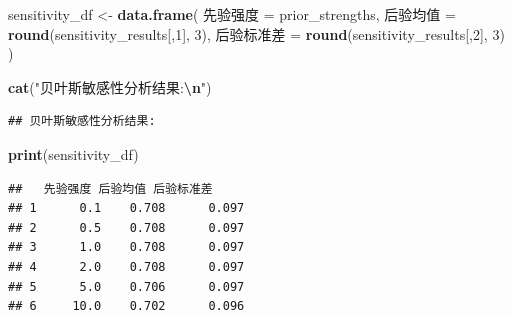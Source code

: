 \documentclass[
]{book}
\newenvironment{Shaded}{\begin{snugshade}}{\end{snugshade}}
\newcommand{\DecValTok}[1]{\textcolor[rgb]{0.00,0.00,0.81}{#1}}
\newcommand{\FunctionTok}[1]{\textcolor[rgb]{0.13,0.29,0.53}{\textbf{#1}}}
\newcommand{\NormalTok}[1]{#1}
\newcommand{\OtherTok}[1]{\textcolor[rgb]{0.56,0.35,0.01}{#1}}
\newcommand{\SpecialCharTok}[1]{\textcolor[rgb]{0.81,0.36,0.00}{\textbf{#1}}}
\newcommand{\StringTok}[1]{\textcolor[rgb]{0.31,0.60,0.02}{#1}}
\begin{document}
\begin{Shaded}
\begin{Highlighting}[]
\NormalTok{sensitivity\_df }\OtherTok{\textless{}{-}} \FunctionTok{data.frame}\NormalTok{(}
\NormalTok{  先验强度 }\OtherTok{=}\NormalTok{ prior\_strengths,}
\NormalTok{  后验均值 }\OtherTok{=} \FunctionTok{round}\NormalTok{(sensitivity\_results[,}\DecValTok{1}\NormalTok{], }\DecValTok{3}\NormalTok{),}
\NormalTok{  后验标准差 }\OtherTok{=} \FunctionTok{round}\NormalTok{(sensitivity\_results[,}\DecValTok{2}\NormalTok{], }\DecValTok{3}\NormalTok{)}
\NormalTok{)}

\FunctionTok{cat}\NormalTok{(}\StringTok{"贝叶斯敏感性分析结果:}\SpecialCharTok{\textbackslash{}n}\StringTok{"}\NormalTok{)}
\end{Highlighting}
\end{Shaded}

\begin{verbatim}
## 贝叶斯敏感性分析结果:
\end{verbatim}

\begin{Shaded}
\begin{Highlighting}[]
\FunctionTok{print}\NormalTok{(sensitivity\_df)}
\end{Highlighting}
\end{Shaded}

\begin{verbatim}
##   先验强度 后验均值 后验标准差
## 1      0.1    0.708      0.097
## 2      0.5    0.708      0.097
## 3      1.0    0.708      0.097
## 4      2.0    0.708      0.097
## 5      5.0    0.706      0.097
## 6     10.0    0.702      0.096
\end{verbatim}
\end{document}
